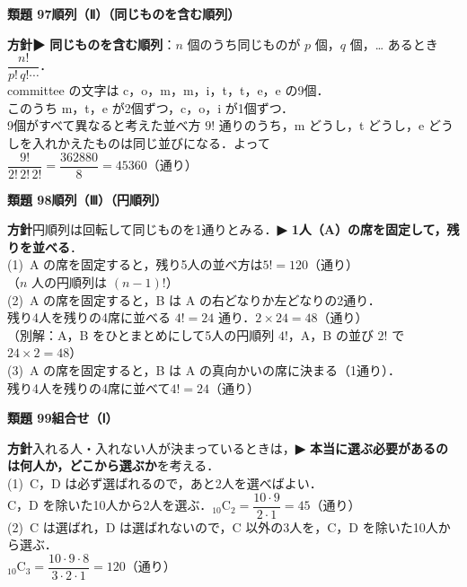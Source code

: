\documentclass[a4paper,11pt]{ltjsarticle}
\newcommand{\ans}[2]{\Needspace{5\baselineskip}\vspace{6pt}%
  {\sffamily\bfseries 類題 #1\quad #2}\par}
\newcommand{\point}[1]{\textsf{\bfseries ▶ #1}}
\begin{document}
\ans{97}{順列（Ⅱ）（同じものを含む順列）}
\begin{kai}
\textbf{方針}\quad \point{同じものを含む順列}：$n$ 個のうち同じものが $p$ 個，$q$ 個，… あるとき $\dfrac{n!}{p!\,q!\cdots}$．\\[2pt]
committee の文字は c，o，m，m，i，t，t，e，e の9個．\\
このうち m，t，e が2個ずつ，c，o，i が1個ずつ．\\[2pt]
9個がすべて異なると考えた並べ方 $9!$ 通りのうち，m どうし，t どうし，e どうしを入れかえたものは同じ並びになる．よって\\
\hspace*{1.5em}$\dfrac{9!}{2!\,2!\,2!}=\dfrac{362880}{8}=45360$（通り）
\end{kai}

\ans{98}{順列（Ⅲ）（円順列）}
\begin{kai}
\textbf{方針}\quad 円順列は回転して同じものを1通りとみる．\point{1人（A）の席を固定して，残りを並べる}．\\[2pt]
(1)\ A の席を固定すると，残り5人の並べ方は\quad $5!=120$（通り）\\
\hspace*{1.5em}（$n$ 人の円順列は $(n-1)!$）\\[2pt]
(2)\ A の席を固定すると，B は A の右どなりか左どなりの2通り．\\
\hspace*{1.5em}残り4人を残りの4席に並べる $4!=24$ 通り．\quad $2\times24=48$（通り）\\
\hspace*{1.5em}（別解：A，B をひとまとめにして5人の円順列 $4!$，A，B の並び $2!$ で $24\times2=48$）\\[2pt]
(3)\ A の席を固定すると，B は A の真向かいの席に決まる（1通り）．\\
\hspace*{1.5em}残り4人を残りの4席に並べて\quad $4!=24$（通り）
\end{kai}

\ans{99}{組合せ（Ⅰ）}
\begin{kai}
\textbf{方針}\quad 入れる人・入れない人が決まっているときは，\point{本当に選ぶ必要があるのは何人か，どこから選ぶか}を考える．\\[2pt]
(1)\ C，D は必ず選ばれるので，あと2人を選べばよい．\\
\hspace*{1.5em}C，D を除いた10人から2人を選ぶ．\quad ${}_{10}\mathrm C_2=\dfrac{10\cdot9}{2\cdot1}=45$（通り）\\[2pt]
(2)\ C は選ばれ，D は選ばれないので，C 以外の3人を，C，D を除いた10人から選ぶ．\\
\hspace*{1.5em}${}_{10}\mathrm C_3=\dfrac{10\cdot9\cdot8}{3\cdot2\cdot1}=120$（通り）
\end{kai}
\end{document}

